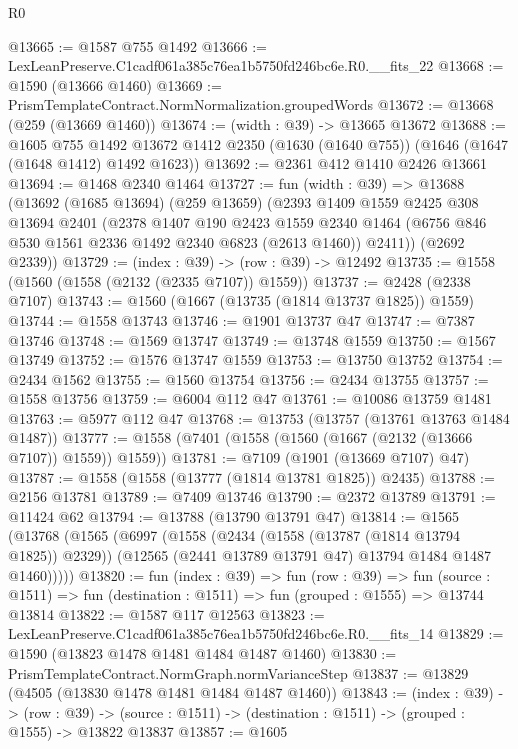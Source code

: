 \begin{lexlean}{R0}
\begin{coremodule}
@13665 := @1587 @755 @1492
@13666 := LexLeanPreserve.C1cadf061a385c76ea1b5750fd246bc6e.R0.__fits_22
@13668 := @1590 (@13666 @1460)
@13669 := PrismTemplateContract.NormNormalization.groupedWords
@13672 := @13668 (@259 (@13669 @1460))
@13674 := (width : @39) -> @13665 @13672
@13688 := @1605
    @755
    @1492
    @13672
    @1412
    @2350
    (@1630 (@1640 @755))
    (@1646 (@1647 (@1648 @1412) @1492 @1623))
@13692 := @2361 @412 @1410 @2426 @13661
@13694 := @1468 @2340 @1464
@13727 := fun (width : @39) =>
  @13688
    (@13692
      (@1685 @13694)
      (@259 @13659)
      (@2393
        @1409
        @1559
        @2425
        @308
        @13694
        @2401
        (@2378
          @1407
          @190
          @2423
          @1559
          @2340
          @1464
          (@6756 @846 @530 @1561 @2336 @1492 @2340 @6823 (@2613 @1460))
          @2411))
      (@2692 @2339))
@13729 := (index : @39) -> (row : @39) -> @12492
@13735 := @1558 (@1560 (@1558 (@2132 (@2335 @7107)) @1559))
@13737 := @2428 (@2338 @7107)
@13743 := @1560 (@1667 (@13735 (@1814 @13737 @1825)) @1559)
@13744 := @1558 @13743
@13746 := @1901 @13737 @47
@13747 := @7387 @13746
@13748 := @1569 @13747
@13749 := @13748 @1559
@13750 := @1567 @13749
@13752 := @1576 @13747 @1559
@13753 := @13750 @13752
@13754 := @2434 @1562
@13755 := @1560 @13754
@13756 := @2434 @13755
@13757 := @1558 @13756
@13759 := @6004 @112 @47
@13761 := @10086 @13759 @1481
@13763 := @5977 @112 @47
@13768 := @13753 (@13757 (@13761 @13763 @1484 @1487))
@13777 := @1558 (@7401 (@1558 (@1560 (@1667 (@2132 (@13666 @7107)) @1559)) @1559))
@13781 := @7109 (@1901 (@13669 @7107) @47)
@13787 := @1558 (@1558 (@13777 (@1814 @13781 @1825)) @2435)
@13788 := @2156 @13781
@13789 := @7409 @13746
@13790 := @2372 @13789
@13791 := @11424 @62
@13794 := @13788 (@13790 @13791 @47)
@13814 := @1565
    (@13768
      (@1565
        (@6997
          (@1558
            (@2434 (@1558 (@13787 (@1814 @13794 @1825)) @2329))
            (@12565 (@2441 @13789 @13791 @47) @13794 @1484 @1487 @1460)))))
@13820 := fun (index : @39) =>
  fun (row : @39) =>
  fun (source : @1511) => fun (destination : @1511) => fun (grouped : @1555) => @13744 @13814
@13822 := @1587 @117 @12563
@13823 := LexLeanPreserve.C1cadf061a385c76ea1b5750fd246bc6e.R0.__fits_14
@13829 := @1590 (@13823 @1478 @1481 @1484 @1487 @1460)
@13830 := PrismTemplateContract.NormGraph.normVarianceStep
@13837 := @13829 (@4505 (@13830 @1478 @1481 @1484 @1487 @1460))
@13843 := (index : @39) ->
  (row : @39) -> (source : @1511) -> (destination : @1511) -> (grouped : @1555) -> @13822 @13837
@13857 := @1605

\end{coremodule}
\end{lexlean}
